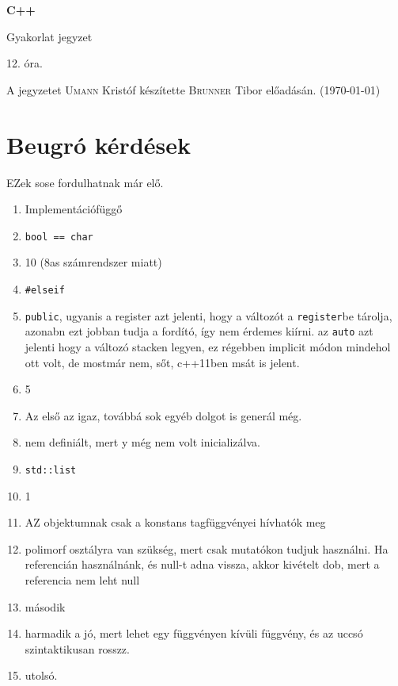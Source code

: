 \documentclass[a4paper,11.5pt]{article}
\begin{document}
	\setlength\parindent{0pt}
	\def\s{\hspace{0.2mm}\vphantom{\beta}}
	\def\Z{\mathbb{Z}}
	\def\Q{\mathbb{Q}}
	\def\R{\mathbb{R}}
	\def\C{\mathbb{C}}
	\def\N{\mathbb{N}}
	\def\Ra{\overline{\mathbb{R}}}
	
	\def\sume{\displaystyle\sum_{n=1}^{+\infty}}
	\def\sumn{\displaystyle\sum_{n=0}^{+\infty}}
	
	\def\narrow{\underset{n\rightarrow+\infty}{\longrightarrow}}
	\def\limn{\displaystyle\lim_{n\to +\infty}}
	\def\limx{\displaystyle\lim_{x\to +\infty}}
	
	\theoremstyle{definition}
	\newtheorem{theorem}{Tétel}[subsection] 
	
	\theoremstyle{definition}
	\newtheorem{definition}[theorem]{Definíció} 
	\newtheorem{example}[theorem]{Példa} 
	\newtheorem{task}[theorem]{Feladat} 
	\newtheorem{note}[theorem]{Megjegyzés}
	\begin{center}
		{\LARGE\textbf{C++}}
		
		{\Large Gyakorlat jegyzet}
		
		12. óra.
	\end{center}
	A jegyzetet \textsc{Umann} Kristóf készítette \textsc{Brunner} Tibor  előadásán. (\today)
	\medskip
	
	
	\section{Beugró kérdések}
	EZek sose fordulhatnak már elő.
	\begin{enumerate}
		\item Implementációfüggő
		\item \texttt{bool == char}
		\item 10 (8as számrendszer miatt)
		\item \texttt{\#elseif}
		\item \texttt{public}, ugyanis a register azt jelenti, hogy a változót a \texttt{register}be tárolja, azonabn ezt jobban tudja a fordító, így nem érdemes kiírni. az \texttt{auto} azt jelenti hogy a változó stacken legyen, ez régebben implicit módon mindehol ott volt, de mostmár nem, sőt, c++11ben msát is jelent.
		\item 5
		\item Az első az igaz, továbbá sok egyéb dolgot is generál még.
		\item nem definiált, mert y még nem volt inicializálva.
		\item \texttt{std::list}
		\item 1
		\item AZ objektumnak csak a konstans tagfüggvényei hívhatók meg
		\item polimorf osztályra van szükség, mert csak mutatókon tudjuk használni. Ha referencián használnánk, és null-t adna vissza, akkor kivételt dob, mert a referencia nem leht null
		\item második
		\item harmadik a jó, mert lehet egy függvényen kívüli függvény, és az uccsó szintaktikusan rosszz.
		\item utolsó.
	\end{enumerate}
\end{document}
